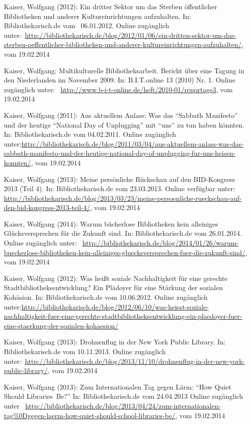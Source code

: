 \documentclass[a4paper,
fontsize=11pt,
oneside,
numbers=noperiodatend,
parskip=half-,
bibliography=totoc,
final
]{scrartcl}
\begin{document}
Kaiser, Wolfgang (2012): Ein dritter Sektor um das Sterben öffentlicher
Bibliotheken und anderer Kultureinrichtungen aufzuhalten. In:
Bibliothekarisch.de vom~ 06.01.2012. Online zugänglich
unter:~\url{http://bibliothekarisch.de/blog/2012/01/06/ein-dritten-sektor-um-das-sterben-oeffentlicher-bibliotheken-und-anderer-kultureinrichtungen-aufzuhalten/},
vom 19.02.2014

Kaiser, Wolfgang: Multikulturelle Bibliotheksarbeit. Bericht über eine
Tagung in den Niederlanden im November 2009. In: B.I.T.online 13 (2010)
Nr. 1. Online zugänglich unter:~
\url{http://www.b-i-t-online.de/heft/2010-01/reportage3}, vom 19.02.2014

Kaiser, Wolfgang (2011): Aus aktuellem Anlass: Was das \enquote{Sabbath
Manifesto} und der heutige \enquote{National Day of Unplugging} mit
\enquote{uns} zu tun haben könnten. In: Bibliothekarisch.de vom
04.02.2011. Online zugänglich
unter:\url{http://bibliothekarisch.de/blog/2011/03/04/aus-aktuellem-anlass-was-das-sabbath-manifesto-und-der-heutige-national-day-of-unplugging-fur-uns-heisen-konnten/},
vom 19.02.2014

Kaiser, Wolfgang (2013): Meine persönliche Rückschau auf den
BID-Kongress 2013 (Teil 4). In: Bibliothekarisch.de vom 23.03.2013.
Online verfügbar unter:~
\url{http://bibliothekarisch.de/blog/2013/03/23/meine-persoenliche-rueckschau-auf-den-bid-kongress-2013-teil-4/},
vom 19.02.2014

Kaiser, Wolfgang (2014): Warum bücherlose Bibliotheken kein alleiniges
Glücksversprechen für die Zukunft sind. In: Bibliothekarisch.de vom
26.01.2014. Online zugänglich unter:~
\url{http://bibliothekarisch.de/blog/2014/01/26/warum-buecherlose-bibliotheken-kein-alleiniges-gluecksversprechen-fuer-die-zukunft-sind/},
vom 19.02.2014

Kaiser, Wolfgang (2012): Was heißt soziale Nachhaltigkeit für eine
gerechte Stadtbibliotheksentwicklung? Ein Plädoyer für eine Stärkung der
sozialen Kohäsion. In: Bibliothekarisch.de vom 10.06.2012. Online
zugänglich
unter:\url{http://bibliothekarisch.de/blog/2012/06/10/was-heisst-soziale-nachhaltigkeit-fuer-eine-gerechte-stadtbibliotheksentwicklung-ein-plaedoyer-fuer-eine-staerkung-der-sozialen-kohaesion/}

Kaiser, Wolfgang (2013): Drohnenflug in der New York Public Library. In:
Bibliothekarisch.de vom 10.11.2013. Online zugänglich
unter:~\url{http://bibliothekarisch.de/blog/2013/11/10/drohnenflug-in-der-new-york-public-library/},
vom 19.02.2014

Kaiser, Wolfgang (2013): Zum Internationalen Tag gegen Lärm:
\enquote{How Quiet Should Libraries~Be?} In: Bibliothekarisch.de vom
24.04.2013 Online zugänglich unter~
\url{http://bibliothekarisch.de/blog/2013/04/24/zum-internationalen-tag\%0Dgegen-laerm-how-quiet-should-school-libraries-be/},
vom 19.02.2014
\end{document}
